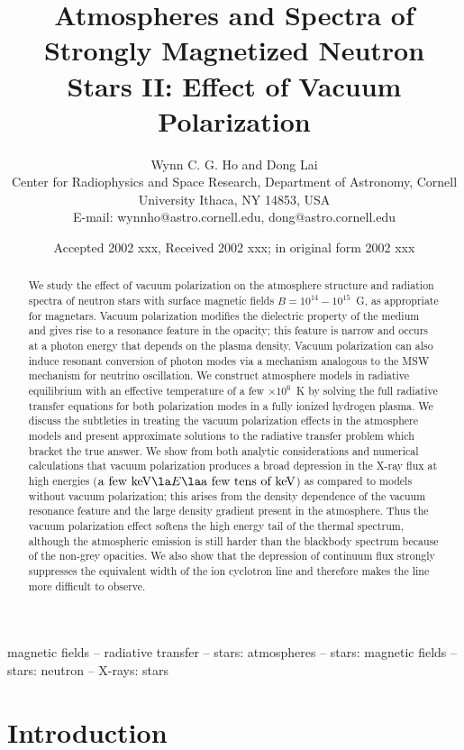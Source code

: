 \documentclass{mn2e}
\title[Atmospheres and Spectra of Strongly Magnetized Neutron Stars II:
Vacuum Polarization]{Atmospheres and Spectra of Strongly
Magnetized Neutron Stars II: Effect of Vacuum Polarization}
\author[W.C.G. Ho and D. Lai]{Wynn C. G. Ho and Dong Lai \\
Center for Radiophysics and Space Research, 
Department of Astronomy, Cornell University
Ithaca, NY 14853, USA \\
{\rm E-mail: wynnho@astro.cornell.edu, dong@astro.cornell.edu}}
\date{Accepted 2002 xxx,
      Received 2002 xxx;
      in original form 2002 xxx}
\begin{document}
\maketitle

\label{firstpage}

\begin{abstract}
We study the effect of vacuum polarization on the atmosphere
structure and radiation spectra of neutron stars with surface
magnetic fields $B=10^{14}-10^{15}$~G, as appropriate for
magnetars.
Vacuum polarization modifies the dielectric property of the
medium and gives rise to a resonance feature in the opacity;
this feature is narrow and occurs at a photon energy that
depends on the plasma density.  Vacuum polarization can also
induce resonant conversion of photon modes via a mechanism
analogous to the MSW mechanism for neutrino oscillation.
We construct atmosphere models in radiative equilibrium with
an effective temperature of a few $\times 10^6$~K by solving
the full radiative transfer equations for both polarization
modes in a fully ionized hydrogen plasma.
We discuss the subtleties in treating the vacuum
polarization effects in the atmosphere models and present
approximate solutions to the radiative transfer problem which
bracket the true answer.
We show from both analytic considerations and numerical
calculations that vacuum polarization produces a broad
depression in the X-ray flux at high energies
($\mbox{a few keV}\la E\la\mbox{a few tens of keV}$)
as compared to models without vacuum polarization; this arises
from the density dependence of the vacuum resonance feature and
the large density gradient present in the atmosphere.
Thus the vacuum polarization effect softens the high energy tail
of the thermal spectrum, although the atmospheric emission is
still harder than the blackbody spectrum because of the non-grey
opacities.
We also show that the depression of continuum flux
strongly suppresses the equivalent width of
the ion cyclotron line and therefore makes the line more difficult
to observe.
\end{abstract}

\begin{keywords}
magnetic fields -- radiative transfer -- stars: atmospheres --
stars: magnetic fields -- stars: neutron -- X-rays: stars
\end{keywords}

\setcounter{equation}{0}
\section{Introduction} \label{sec:intro}
\end{document}
